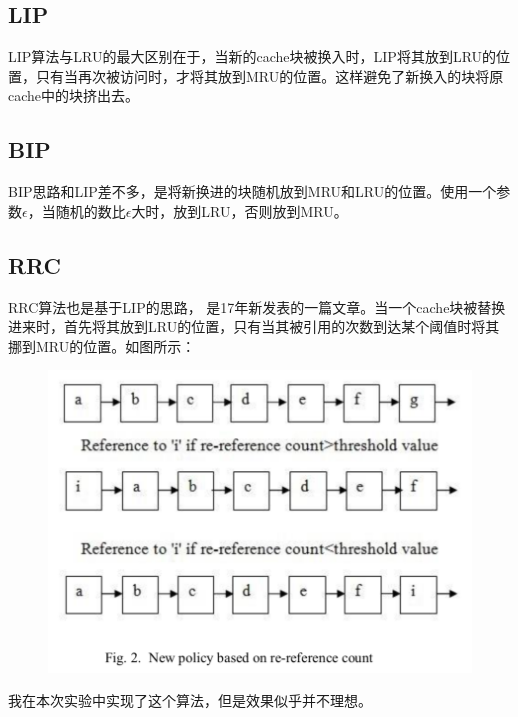 \documentclass[utf8]{article}
\begin{document}
\subsection{LIP}
LIP算法与LRU的最大区别在于，当新的cache块被换入时，LIP将其放到LRU的位置，只有当再次被访问时，才将其放到MRU的位置。这样避免了新换入的块将原cache中的块挤出去。

\subsection{BIP}
BIP思路和LIP差不多，是将新换进的块随机放到MRU和LRU的位置。使用一个参数$\epsilon$，当随机的数比$\epsilon$大时，放到LRU，否则放到MRU。

\subsection{RRC}
RRC算法也是基于LIP的思路， 是17年新发表的一篇文章\cite{1}。当一个cache块被替换进来时，首先将其放到LRU的位置，只有当其被引用的次数到达某个阈值时将其挪到MRU的位置。如图所示：
\begin{figure}[H]
	\centering
	\includegraphics[scale=0.5]{./photos/rrc.png}
	\label{Fig1}
\end{figure}
我在本次实验中实现了这个算法，但是效果似乎并不理想。
\end{document}

